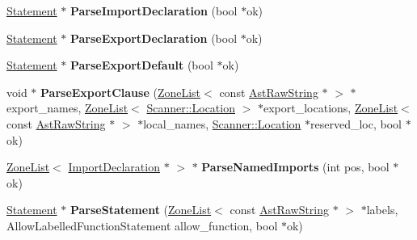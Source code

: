 \begin{DoxyCompactItemize}
\item 
\hyperlink{classv8_1_1internal_1_1_statement}{Statement} $\ast$ {\bfseries Parse\+Import\+Declaration} (bool $\ast$ok)\hypertarget{classv8_1_1internal_1_1_parser_aa4e69f3389129cdabec2a4e0ed0573c6}{}\label{classv8_1_1internal_1_1_parser_aa4e69f3389129cdabec2a4e0ed0573c6}

\item 
\hyperlink{classv8_1_1internal_1_1_statement}{Statement} $\ast$ {\bfseries Parse\+Export\+Declaration} (bool $\ast$ok)\hypertarget{classv8_1_1internal_1_1_parser_a464f3351da588ae82b4ca9bca77062d6}{}\label{classv8_1_1internal_1_1_parser_a464f3351da588ae82b4ca9bca77062d6}

\item 
\hyperlink{classv8_1_1internal_1_1_statement}{Statement} $\ast$ {\bfseries Parse\+Export\+Default} (bool $\ast$ok)\hypertarget{classv8_1_1internal_1_1_parser_adade831ea22121ddc80674fa8726e837}{}\label{classv8_1_1internal_1_1_parser_adade831ea22121ddc80674fa8726e837}

\item 
void $\ast$ {\bfseries Parse\+Export\+Clause} (\hyperlink{classv8_1_1internal_1_1_zone_list}{Zone\+List}$<$ const \hyperlink{classv8_1_1internal_1_1_ast_raw_string}{Ast\+Raw\+String} $\ast$ $>$ $\ast$export\+\_\+names, \hyperlink{classv8_1_1internal_1_1_zone_list}{Zone\+List}$<$ \hyperlink{structv8_1_1internal_1_1_scanner_1_1_location}{Scanner\+::\+Location} $>$ $\ast$export\+\_\+locations, \hyperlink{classv8_1_1internal_1_1_zone_list}{Zone\+List}$<$ const \hyperlink{classv8_1_1internal_1_1_ast_raw_string}{Ast\+Raw\+String} $\ast$ $>$ $\ast$local\+\_\+names, \hyperlink{structv8_1_1internal_1_1_scanner_1_1_location}{Scanner\+::\+Location} $\ast$reserved\+\_\+loc, bool $\ast$ok)\hypertarget{classv8_1_1internal_1_1_parser_a3cb8105fd10abc1f21f0a511c082acd6}{}\label{classv8_1_1internal_1_1_parser_a3cb8105fd10abc1f21f0a511c082acd6}

\item 
\hyperlink{classv8_1_1internal_1_1_zone_list}{Zone\+List}$<$ \hyperlink{classv8_1_1internal_1_1_import_declaration}{Import\+Declaration} $\ast$ $>$ $\ast$ {\bfseries Parse\+Named\+Imports} (int pos, bool $\ast$ok)\hypertarget{classv8_1_1internal_1_1_parser_a057b5b47ecfe47d70adca0f04b696d0e}{}\label{classv8_1_1internal_1_1_parser_a057b5b47ecfe47d70adca0f04b696d0e}

\item 
\hyperlink{classv8_1_1internal_1_1_statement}{Statement} $\ast$ {\bfseries Parse\+Statement} (\hyperlink{classv8_1_1internal_1_1_zone_list}{Zone\+List}$<$ const \hyperlink{classv8_1_1internal_1_1_ast_raw_string}{Ast\+Raw\+String} $\ast$ $>$ $\ast$labels, Allow\+Labelled\+Function\+Statement allow\+\_\+function, bool $\ast$ok)\hypertarget{classv8_1_1internal_1_1_parser_a19c25c492842a4febd0769160a1caa3f}{}\label{classv8_1_1internal_1_1_parser_a19c25c492842a4febd0769160a1caa3f}


\end{DoxyCompactItemize}
